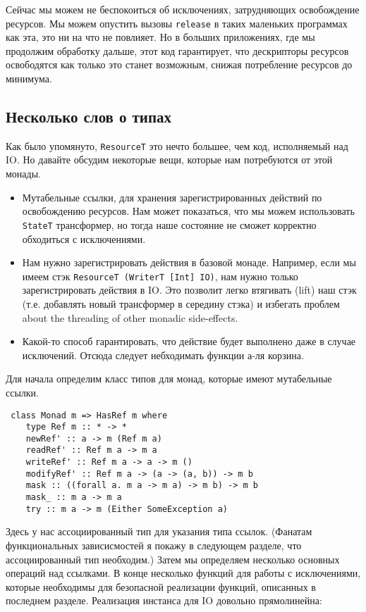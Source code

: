 Сейчас мы можем не беспокоиться об исключениях, затрудняющих освобождение ресурсов. Мы
можем опустить вызовы \verb=release= в таких маленьких программах как эта, это ни на что
не повлияет. Но в больших приложениях, где мы продолжим обработку дальше, этот код
гарантирует, что дескрипторы ресурсов освободятся как только это станет возможным, снижая
потребление ресурсов до минимума.

\subsection{Несколько слов о типах}

Как было упомянуто, \lstinline'ResourceT' это нечто большее, чем код, исполняемый над IO.
Но давайте обсудим некоторые вещи, которые нам потребуются от этой монады.
\begin{itemize}
\item Мутабельные ссылки, для хранения зарегистрированных действий по освобождению
ресурсов. Нам может показаться, что мы можем использовать \lstinline'StateT' трансформер,
но тогда наше состояние не сможет корректно обходиться с исключениями.
\item Нам нужно зарегистрировать действия в базовой монаде. Например, если мы имеем 
стэк \lstinline'ResourceT (WriterT [Int] IO)', нам нужно только зарегистрировать
действия в IO. Это позволит легко втягивать (lift) наш стэк (т.е. добавлять новый
трансформер в середину стэка) и избегать проблем about the
threading of other monadic side-effects.
\item Какой-то способ гарантировать, что действие будет выполнено даже в случае
исключений. Отсюда следует небходимать функции а-ля корзина.
\end{itemize}

Для начала определим класс типов для монад, которые имеют мутабельные ссылки.
\begin{lstlisting}
 class Monad m => HasRef m where
    type Ref m :: * -> *
    newRef' :: a -> m (Ref m a)
    readRef' :: Ref m a -> m a
    writeRef' :: Ref m a -> a -> m ()
    modifyRef' :: Ref m a -> (a -> (a, b)) -> m b
    mask :: ((forall a. m a -> m a) -> m b) -> m b
    mask_ :: m a -> m a
    try :: m a -> m (Either SomeException a)
\end{lstlisting}

Здесь у нас ассоциированный тип для указания типа ссылок. (Фанатам функциональных 
зависисмостей я покажу в следующем разделе, что ассоциированный тип необходим.) 
Затем мы определяем несколько основных операций над ссылками.
В конце несколько функций для работы с
исключениями, которые необходимы для безопасной реализации функций, описанных в
последнем разделе. Реализация инстанса для IO довольно прямолинейна:
  
